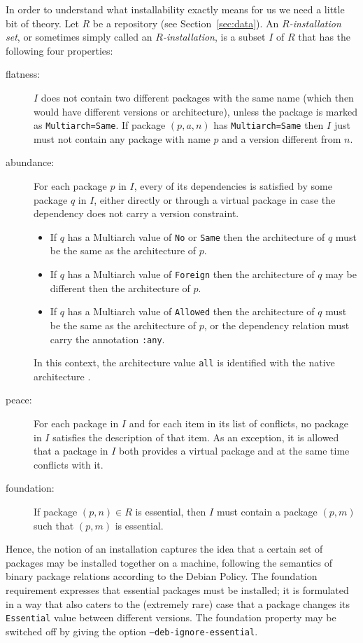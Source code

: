 In order to understand what installability exactly means for us we
need a little bit of theory.  Let $R$ be a repository (see
Section~\ref{sec:data}).  An \emph{$R$-installation set}, or sometimes
simply called an \emph{$R$-installation}, is a subset $I$ of $R$ that
has the following four properties:
\begin{description}
  \item[flatness:] $I$ does not contain two different packages with
    the same name (which then would have different versions or
    architecture), unless the package is marked as
    \texttt{Multiarch=Same}. If package $(p,a,n)$ has
    \texttt{Multiarch=Same} then $I$ just must not contain any package
    with name $p$ and a version different from $n$.
  \item[abundance:] For each package $p$ in $I$, every of its
    dependencies is satisfied by some package $q$ in $I$, either
    directly or through a virtual package in case the dependency does
    not carry a version constraint. 
    \begin{itemize}
    \item If $q$ has a Multiarch value of \texttt{No} or \texttt{Same}
      then the architecture of $q$ must be the same as the
      architecture of $p$.
    \item If $q$ has a Multiarch value of \texttt{Foreign} then the
      architecture of $q$ may be different then the architecture of $p$.
    \item If $q$ has a Multiarch value of \texttt{Allowed} then the
      architecture of $q$ must be the same as the architecture of $p$,
      or the dependency relation must carry the annotation \texttt{:any}.
    \end{itemize}
    In this context, the architecture value \texttt{all} is identified with
    the native architecture \cite{ubuntu:multiarch}.
  \item[peace:] For each package in $I$ and for each item in its list
    of conflicts, no package in $I$ satisfies the description of that
    item.  As an exception, it is allowed that a package in $I$ both
    provides a virtual package and at the same time conflicts with it.
  \item[foundation:] If package $(p,n)\in R$ is essential, then $I$
    must contain a package $(p,m)$ such that $(p,m)$ is essential.
\end{description}
Hence, the notion of an installation captures the idea that a certain
set of packages may be installed together on a machine, following the
semantics of binary package relations according to the Debian Policy.
The foundation requirement expresses that essential packages must be
installed; it is formulated in a way that also caters to the
(extremely rare) case that a package changes its \texttt{Essential}
value between different versions. The foundation property may be
switched off by giving the option \texttt{--deb-ignore-essential}.

